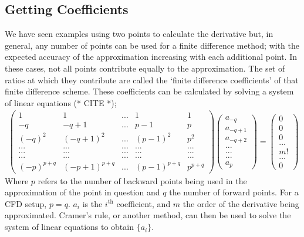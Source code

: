 \subsection{Getting Coefficients}
We have seen examples using two points to calculate the derivative but, in general, any number of points can be used for a finite difference method; with the expected accuracy of the approximation increasing with each additional point. In these cases, not all points contribute equally to the approximation. The set of ratios at which they contribute are called the `finite difference coefficients' of that finite difference scheme. These coefficients can be calculated by solving a system of linear equations (* CITE *);
\begin{align*}
\begin{pmatrix}
1&1&...&1&1\\
-q&-q+1&...&p-1&p\\
(-q)^{2}&(-q+1)^{2}&...&(p-1)^{2}&p^{2}\\
...&...&...&...&...\\
...&...&...&...&...\\
...&...&...&...&...\\
(-p)^{p+q}&(-p+1)^{p+q}&...&(p-1)^{p+q}&p^{p+q}
\end{pmatrix}{\begin{pmatrix}
a_{-q}\\
a_{-q+1}\\
a_{-q+2}\\
...\\
...\\
...\\
a_{p}
\end{pmatrix}} = {\begin{pmatrix}
0\\
0\\
0\\
...\\
m!\\
...\\
0
\end{pmatrix}}
\end{align*}
Where $p$ refers to the number of backward points being used in the approximation of the point in question and $q$ the number of forward points. For a CFD setup, $p=q$. 
$a_{i}$ is the $i^{\text{th}}$ coefficient, and $m$ the order of the derivative being approximated. Cramer's rule, or another method, can then be used to solve the system of linear equations to obtain $\{a_{i}\}$.

